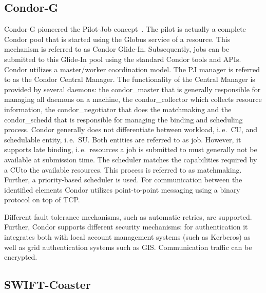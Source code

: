 \documentclass[conference,final]{IEEEtran}
\newcommand{\cu}{CU}
\newcommand{\upp}{\vspace*{-0.5em}}
\begin{document}
\upp
\subsection{Condor-G\upp\upp}

Condor-G pioneered the Pilot-Job concept~\cite{condor-g}. The pilot is
actually a complete Condor pool that is started using the Globus
service of a resource. This mechanism is referred to as Condor
Glide-In. Subsequently, jobs can be submitted to this Glide-In pool
using the standard Condor tools and APIs. Condor utilizes a
master/worker coordination model. The PJ manager is referred to as the
Condor Central Manager. The functionality of the Central Manager is
provided by several daemons: the condor\_master that is generally
responsible for managing all daemons on a machine, the
condor\_collector which collects resource information, the
condor\_negotiator that does the matchmaking and the condor\_schedd
that is responsible for managing the binding and scheduling
process. Condor generally does not differentiate between workload,
i.\,e.\ \cu, and schedulable entity, i.\,e.\ SU. Both entities are
referred to as job. However, it supports late binding, i.\,e.\
resources a job is submitted to must generally not be available at
submission time. The scheduler matches the capabilities required by a
\cu to the available resources. This process is referred to as
matchmaking. Further, a priority-based scheduler is used. For
communication between the identified elements Condor utilizes
point-to-point messaging using a binary protocol on top of TCP.

Different fault tolerance mechanisms, such as automatic retries, are
supported.  Further, Condor supports different security mechanisms:
for authentication it integrates both with local account management
systems (such as Kerberos) as well as grid authentication systems such
as GIS. Communication traffic can be encrypted.


\upp
\subsection{SWIFT-Coaster\upp\upp}
\end{document}
